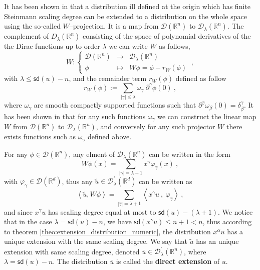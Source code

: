 \documentclass[11pt]{book}
\newcommand{\sd}{\mathsf{sd}}
\newcommand{\abs}[1]{\left|#1\right|}
\newcommand{\sm}[1]{\left\langle#1\right\rangle}
\newcommand{\Dcal}{\mathcal{D}}
\newcommand{\Rbb}{\mathbb{R}}
\theoremstyle{break}
\begin{document}
It has been shown in \cite{brunetti_microlocal_2000} that a distribution ill defined at the origin which has finite Steinmann scaling degree can be extended to a distribution on the whole space using the so-called $W$--projection. It is a map from $\Dcal(\Rbb^n)$ to $\Dcal_\lambda(\Rbb^n)$. The complement of $D_\lambda(\Rbb^n)$ consisting of the space of polynomial derivatives of the the Dirac functions up to order $\lambda$ we can write $W$ as follows,
%
\begin{equation}
W : \left\{
\begin{array}{ccl}
\Dcal(\Rbb^n) & \to & \Dcal_\lambda(\Rbb^n) \\
\phi & \mapsto & W \phi = \phi - r_W(\phi)
\end{array}
\right. \ , \label{eq:w_projection}
\end{equation}
%
with $\lambda \leq \sd(u)-n$, and the remainder term $r_W(\phi)$ defined as follow
%
\begin{equation*}
r_W(\phi) := \underset{\abs{\gamma}\leq\lambda}{\sum} \omega_\gamma \ \partial^\gamma \phi(0) \ ,
\end{equation*}
%
where $\omega_\gamma$ are smooth compactly supported functions such that $\partial^\gamma\omega_\beta(0) = \delta^\gamma_\beta$. It has been shown in \cite[lemma 11]{duetsch_causal_2004} that for any such functions $\omega_\gamma$ we can construct the linear map $W$ from $\Dcal(\Rbb^n)$ to $\Dcal_\lambda(\Rbb^n)$, and conversely for any such projector $W$ there exists functions such as $\omega_\gamma$ defined above.


For any $\phi \in \Dcal(\Rbb^n)$, any elment of $\Dcal_\lambda(\Rbb^n)$ can be written in the form
%
\begin{equation*}
W \phi(x) = \sum_{\abs{\gamma}=\lambda+1} x^\gamma \varphi_\gamma(x) \ ,
\end{equation*}
%
with $\varphi_\gamma \in \Dcal(\Rbb^d)$, thus any $\tilde{u} \in \Dcal^\prime_\lambda(\Rbb^d)$ can be written as
% 
\begin{equation*}
\sm{\tilde{u},W\phi} = \sum_{\abs{\gamma}=\lambda+1} \sm{x^\gamma u \ , \ \varphi_\gamma} \ ,
\end{equation*}
%
and since $x^\gamma u$ has scaling degree equal at most to $\sd(u) - (\lambda+1)$. We notice that in the case $\lambda = \sd(u) - n$, we have $\sd(x^\gamma u)\leq n+1 < n$, thus according to theorem \ref{theo:extension_distribution_numeric}, the distribution $x^\alpha u$ has a unique extension with the same scaling degree. We say that $\tilde{u}$ has an unique extension with same scaling degree, denoted $\overline{u} \in \Dcal^\prime_\lambda(\Rbb^n)$, where $\lambda = \sd(u) - n$. The distribution $\overline{u}$ is called the \textbf{direct extension} of $u$.
\end{document}
